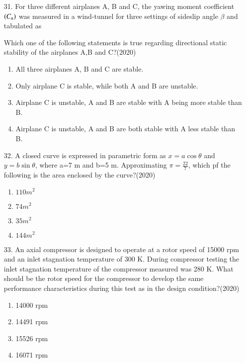 \documentclass[journal]{IEEEtran}
\begin{document}
\begin{enumerate}
    \item[31.] For three different airplanes A, B and C, the yawing moment coefficient $\left(C_n\right)$ was measured in a wind-tunnel for three settings of sideslip angle $\beta$ and tabulated as
    \begin{table}
        \centering
        \caption{}
    \end{table}
    Which one of the following statements is true regarding directional static stability of the airplanes A,B and C?\hfill (2020)
    \begin{enumerate}[label=(\Alph*)]
        \item All three airplanes A, B and C are stable.
        \item Only airplane C is stable, while both A and B are unstable.
        \item Airplane C is unstable, A and B are stable with A being more stable than B.
        \item Airplane C is unstable, A and B are both stable with A less stable than B.
    \end{enumerate}
    \item[32.] A closed curve is expressed in parametric form as $x =a\cos\theta$ and $y=b\sin\theta$, where a=7 m and b=5 m. Approximating $\pi = \frac{22}{7}$, which pf the following is the area enclosed by the curve?\hfill (2020)
    \begin{enumerate}[label=(\Alph*)]
        \item $110 m^2$
        \item $74 m^2$
        \item $35 m^2$
        \item $144 m^2$
    \end{enumerate}
    \item[33.] An axial compressor is designed to operate at a rotor speed of 15000 rpm and an inlet stagnation temperature of 300 K. During compressor testing the inlet stagnation temperature of the compressor  measured was 280 K. What should be the rotor speed for the compressor to develop the same performance characteristics during this test as in the design condition?\hfill (2020)
    \begin{enumerate}
        \item 14000 rpm
        \item 14491 rpm
        \item 15526 rpm 
        \item 16071 rpm

\end{enumerate}
\end{enumerate}
\end{document}
